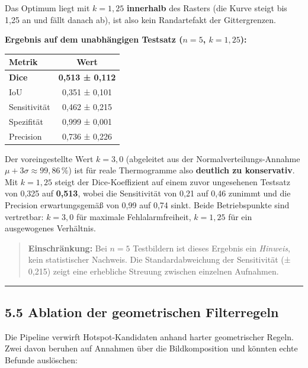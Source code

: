 \documentclass[
  11pt,
]{article}
\newcounter{none} %
\begin{document}
Das Optimum liegt mit \(k = 1{,}25\) \textbf{innerhalb} des Rasters (die
Kurve steigt bis 1,25 an und fällt danach ab), ist also kein
Randartefakt der Gittergrenzen.

\textbf{Ergebnis auf dem unabhängigen Testsatz (\(n = 5\),
\(k = 1{,}25\)):}

{\def\LTcaptype{none} %
\begin{longtable}[]{@{}lc@{}}
\toprule\noalign{}
Metrik & Wert \\
\midrule\noalign{}
\endhead
\bottomrule\noalign{}
\endlastfoot
\textbf{Dice} & \textbf{0,513 ± 0,112} \\
IoU & 0,351 ± 0,101 \\
Sensitivität & 0,462 ± 0,215 \\
Spezifität & 0,999 ± 0,001 \\
Precision & 0,736 ± 0,226 \\
\end{longtable}
}

Der voreingestellte Wert \(k = 3{,}0\) (abgeleitet aus der
Normalverteilungs-Annahme \(\mu + 3\sigma \approx 99{,}86\,\%\)) ist für
reale Thermogramme also \textbf{deutlich zu konservativ}. Mit
\(k = 1{,}25\) steigt der Dice-Koeffizient auf einem zuvor ungesehenen
Testsatz von 0,325 auf \textbf{0,513}, wobei die Sensitivität von 0,21
auf 0,46 zunimmt und die Precision erwartungsgemäß von 0,99 auf 0,74
sinkt. Beide Betriebspunkte sind vertretbar: \(k = 3{,}0\) für maximale
Fehlalarmfreiheit, \(k = 1{,}25\) für ein ausgewogenes Verhältnis.

\begin{quote}
\textbf{Einschränkung:} Bei \(n = 5\) Testbildern ist dieses Ergebnis
ein \emph{Hinweis}, kein statistischer Nachweis. Die Standardabweichung
der Sensitivität (± 0,215) zeigt eine erhebliche Streuung zwischen
einzelnen Aufnahmen.
\end{quote}

\begin{center}\rule{0.5\linewidth}{0.5pt}\end{center}

\subsection{5.5 Ablation der geometrischen
Filterregeln}\label{ablation-der-geometrischen-filterregeln}

Die Pipeline verwirft Hotspot-Kandidaten anhand harter geometrischer
Regeln. Zwei davon beruhen auf Annahmen über die Bildkomposition und
könnten echte Befunde auslöschen:
\end{document}
